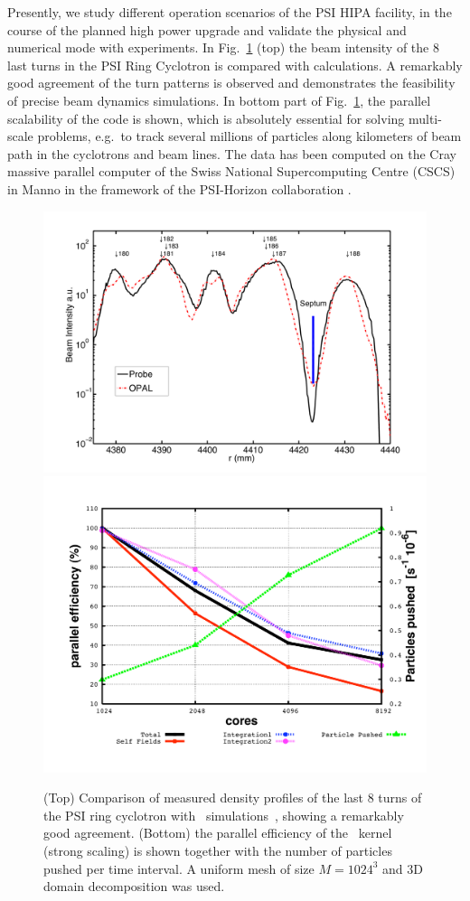 \documentclass[11pt,pdftex]{article}
\newcommand{\gnuplotrot}{0.0}
\begin{document}
Presently, we study different operation scenarios of the PSI HIPA facility,  in the course of the planned high power upgrade and validate
the physical and numerical mode with experiments. In
Fig.~\ref{fig:xt3opal} (top) the beam intensity of the 8 last turns in
the PSI Ring Cyclotron is compared with calculations. A remarkably good
agreement of the turn patterns is observed and demonstrates the
feasibility of precise beam dynamics simulations.  In bottom part of
Fig.~\ref{fig:xt3opal}, the parallel scalability of the code is shown,
which is absolutely essential for solving multi-scale problems, e.g.\ to
track several millions of particles along kilometers of beam path in the
cyclotrons and beam lines.  The data has been computed on the Cray
massive parallel computer of the Swiss National Supercomputing Centre
(CSCS) in Manno in the framework of the PSI-Horizon collaboration
\cite{horpsi}.
\begin{figure}[h]
  \begin{center}
    \includegraphics[width=.49\linewidth]{./figures/rre4v0108log}
    \includegraphics[angle=\gnuplotrot,scale=0.3]{./figures/drift2c1.pdf}
  \end{center}
  \caption{(Top) Comparison of measured density profiles of the last 8
    turns of the PSI ring cyclotron with \opal\ simulations~\cite{bi:1},
    showing a remarkably good agreement.  (Bottom) the parallel
    efficiency of the \opal\ kernel (strong scaling) is shown together
    with the number of particles pushed per time interval. A uniform
    mesh of size $M=1024^3$ and 3D domain decomposition was used.}
  \label{fig:xt3opal}
\end{figure}
\end{document}
